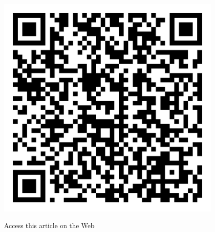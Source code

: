 \begin{figure}[H]
\centering
\includegraphics[scale=.15]{src/Figures/QR-codes/qr-code_characterization-of.png}

\medskip

{\large\sf Access this article on the Web}
\end{figure}
